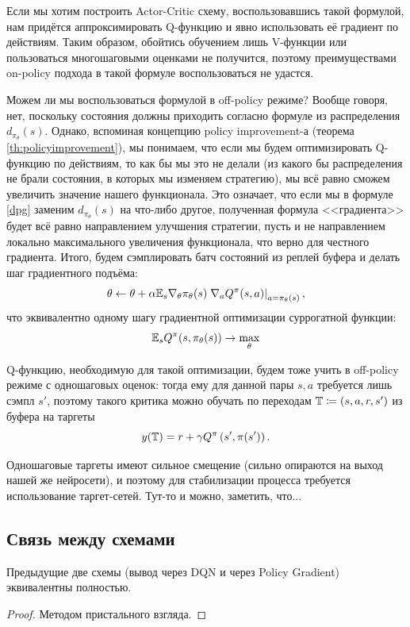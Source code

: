 Если мы хотим построить Actor-Critic схему, воспользовавшись такой формулой, нам придётся аппроксимировать Q-функцию и явно использовать её градиент по действиям. Таким образом, обойтись обучением лишь V-функции или пользоваться многошаговыми оценками не получится, поэтому преимуществами on-policy подхода в такой формуле воспользоваться не удастся.

Можем ли мы воспользоваться формулой в off-policy режиме? Вообще говоря, нет, поскольку состояния должны приходить согласно формуле из распределения $d_{\pi_\theta}(s)$. Однако, вспоминая концепцию policy improvement-а (теорема \ref{th:policyimprovement}), мы понимаем, что если мы будем оптимизировать Q-функцию по действиям, то как бы мы это не делали (из какого бы распределения не брали состояния, в которых мы изменяем стратегию), мы всё равно сможем увеличить значение нашего функционала. Это означает, что если мы в формуле \eqref{dpg} заменим $d_{\pi_\theta}(s)$ на что-либо другое, полученная формула <<градиента>> будет всё равно направлением улучшения стратегии, пусть и не направлением локально максимального увеличения функционала, что верно для честного градиента. Итого, будем сэмплировать батч состояний из реплей буфера и делать шаг градиентного подъёма: 
$$\theta \leftarrow \theta + \alpha \mathbb{E}_{s} \nabla_\theta \pi_\theta(s) \left. \nabla_a Q^{\pi}(s, a) \right|_{a = \pi_\theta(s)},$$
что эквивалентно одному шагу градиентной оптимизации суррогатной функции:
\begin{equation}\label{ddpg_actor}
\mathbb{E}_s Q^{\pi}(s, \pi_{\theta}(s)) \to \max_{\theta}
\end{equation}

Q-функцию, необходимую для такой оптимизации, будем тоже учить в off-policy режиме с одношаговых оценок: тогда ему для данной пары $s,a$ требуется лишь сэмпл $s'$, поэтому такого критика можно обучать по переходам $\mathbb{T} \coloneqq (s, a, r, s')$ из буфера на таргеты
$$y(\mathbb{T}) = r + \gamma Q^{\pi}\left( s', \pi(s') \right).$$

Одношаговые таргеты имеют сильное смещение (сильно опираются на выход нашей же нейросети), и поэтому для стабилизации процесса требуется использование таргет-сетей. Тут-то и можно, заметить, что...

\subsection{Связь между схемами}

\begin{theorem}
Предыдущие две схемы (вывод через DQN и через Policy Gradient) эквивалентны полностью.
\begin{proof}
Методом пристального взгляда.
\end{proof}
\end{theorem}


